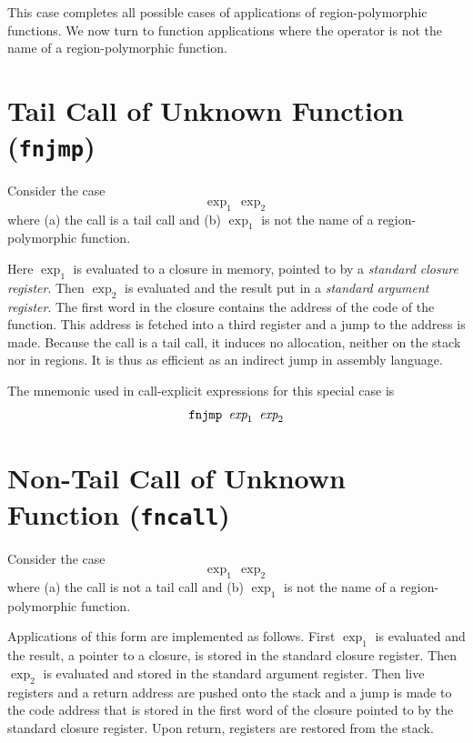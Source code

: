 \documentclass[12pt]{book}
\begin{document}
This case completes all possible cases of applications of
region-polymorphic functions. We now turn to function applications
where the operator is not the name of a region-polymorphic function.

\section{Tail Call of Unknown Function (\texttt{fnjmp})}
Consider the case
$$\exp_1\,\exp_2$$
where (a) the call is a tail call and (b) $\exp_1$
is not the name of a region-polymorphic function.

Here $\exp_1$ is evaluated to a closure in memory, pointed to by a 
%
%
{\em standard closure register}. Then $\exp_2$ is evaluated and the result
put in a
%
%
{\em standard argument register}. The first word in the closure
contains the address of the code of the function. This address is
fetched into a third register and a jump to the address is made.
Because the call is a tail call, it induces no allocation, neither on
the stack nor in regions.  It is thus as efficient as an indirect jump
in assembly language.


The mnemonic used in call-explicit expressions for this special case is
$$\hbox{\tt fnjmp $\hbox{\it exp}_1$ $\hbox{\it exp}_2$}$$

\section{Non-Tail Call of Unknown Function (\texttt{fncall})}
Consider the case
$$\exp_1\,\exp_2$$
where (a) the call is not a tail call and (b)
$\exp_1$ is not the name of a region-polymorphic function.

Applications of this form are implemented as follows. First $\exp_1$
is evaluated and the result, a pointer to a closure, is stored in the
%
%
standard closure register. Then $\exp_2$ is evaluated and stored in
the 
%
%
standard argument register.  Then live registers and a return
address are pushed onto the stack and a jump is made to the code
address that is stored in the first word of the closure pointed to by
the standard closure register. Upon return, registers are restored
from the stack.
\end{document}
